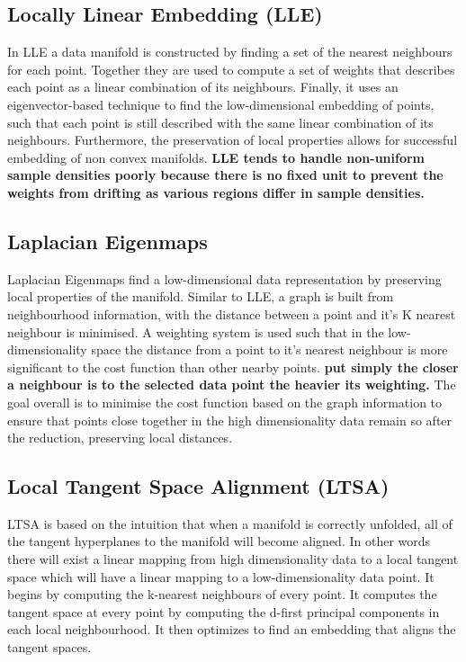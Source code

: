 \subsection{Locally Linear Embedding (LLE)}
In LLE a data manifold is constructed by finding a set of the nearest neighbours for each point\cite{Roweis2000}. Together they are used to compute a set of weights that describes each point as a linear combination of its neighbours. Finally, it uses an eigenvector-based technique to find the low-dimensional embedding of points, such that each point is still described with the same linear combination of its neighbours. Furthermore, the preservation of local properties allows for successful embedding of non convex manifolds.
{\bf LLE tends to handle non-uniform sample densities poorly because there is no fixed unit to prevent the weights from drifting as various regions differ in sample densities.}

\subsection{Laplacian Eigenmaps}
Laplacian Eigenmaps find a low-dimensional data representation by preserving local properties of the manifold.\cite{Belkin2003} Similar to LLE, a graph is built from neighbourhood information, with the distance between a point and it's K nearest neighbour is minimised. A weighting system is used such that in the low-dimensionality space the distance from a point to it's nearest neighbour is more significant to the cost function than other nearby points. {\bf put simply the closer a neighbour is to the selected data point the heavier its weighting.} The goal overall is to minimise the cost function based on the graph information to ensure that points close together in the high dimensionality data remain so after the reduction, preserving local distances. 


\subsection{Local Tangent Space Alignment (LTSA)}
LTSA is based on the intuition that when a manifold is correctly unfolded, all of the tangent hyperplanes to the manifold will become aligned.\cite{Zhang2003} In other words there will exist a linear mapping from high dimensionality data to a local tangent space which will have a linear mapping to a low-dimensionality data point. It begins by computing the k-nearest neighbours of every point. It computes the tangent space at every point by computing the d-first principal components in each local neighbourhood. It then optimizes to find an embedding that aligns the tangent spaces.


